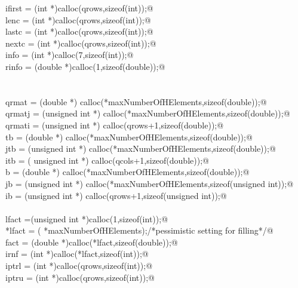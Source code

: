 \documentclass[12pt]{article}
\begin{document}
\begin{flushleft}
\begin{minipage}{\linewidth}
\begin{list}{}{}
\mbox{}\verb@        ifirst = (int *)calloc(qrows,sizeof(int));@\\
\mbox{}\verb@        lenc = (int *)calloc(qrows,sizeof(int));@\\
\mbox{}\verb@        lastc = (int *)calloc(qrows,sizeof(int));@\\
\mbox{}\verb@        nextc = (int *)calloc(qrows,sizeof(int));@\\
\mbox{}\verb@        info = (int *)calloc(7,sizeof(int));@\\
\mbox{}\verb@        rinfo = (double *)calloc(1,sizeof(double));@\\
\mbox{}\verb@@\\
\mbox{}\verb@@\\
\mbox{}\verb@        qrmat = (double *) calloc(*maxNumberOfHElements,sizeof(double));@\\
\mbox{}\verb@        qrmatj = (unsigned int *) calloc(*maxNumberOfHElements,sizeof(double));@\\
\mbox{}\verb@        qrmati = (unsigned int *) calloc(qrows+1,sizeof(double));@\\
\mbox{}\verb@        tb = (double *) calloc(*maxNumberOfHElements,sizeof(double));@\\
\mbox{}\verb@        jtb = (unsigned int *) calloc(*maxNumberOfHElements,sizeof(double));@\\
\mbox{}\verb@        itb = ( unsigned int *) calloc(qcols+1,sizeof(double));@\\
\mbox{}\verb@        b = (double *) calloc(*maxNumberOfHElements,sizeof(double));@\\
\mbox{}\verb@        jb = (unsigned int *) calloc(*maxNumberOfHElements,sizeof(unsigned int));@\\
\mbox{}\verb@        ib = (unsigned int *) calloc(qrows+1,sizeof(unsigned int));@\\
\mbox{}\verb@@\\
\mbox{}\verb@        lfact =(unsigned int *)calloc(1,sizeof(int));@\\
\mbox{}\verb@        *lfact = (  *maxNumberOfHElements);/*pessimistic setting for filling*/@\\
\mbox{}\verb@        fact = (double *)calloc(*lfact,sizeof(double));@\\
\mbox{}\verb@        irnf = (int *)calloc(*lfact,sizeof(int));@\\
\mbox{}\verb@        iptrl = (int *)calloc(qrows,sizeof(int));@\\
\mbox{}\verb@        iptru = (int *)calloc(qrows,sizeof(int));@\\

\end{list}
\end{minipage}
\end{flushleft}
\end{document}
